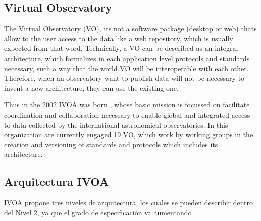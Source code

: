 \subsection{Virtual Observatory}


The Virtual Observatory (VO), its not a software package (desktop or web) thats
allow to the user access to the data like a web repository, which is usually
expected from that word. Technically, a VO can be described as an integral
architecture, which formalizes in each application level protocols and
standards necessary, such a way that the world VO will be interoperable with
each other.  Therefore, when an observatory want to publish data will not be
necessary to invent a new architecture, they can use the existing one.

Thus in the 2002 IVOA was born \cite{ivoa}, whose basic mission is focussed on
facilitate coordination and collaboration necessary to enable global and
integrated access to data collected by the international astronomical
observatories. In this organization are currently engaged 19 VO, which work by
working groups in the creation and versioning of standards and protocols which
includes its architecture.

\subsection{Arquitectura IVOA}

IVOA propone tres niveles de arquitectura, los cuales se pueden describir
dentro del Nivel 2, ya que el grado de especificación va aumentando \cite{arch}.


